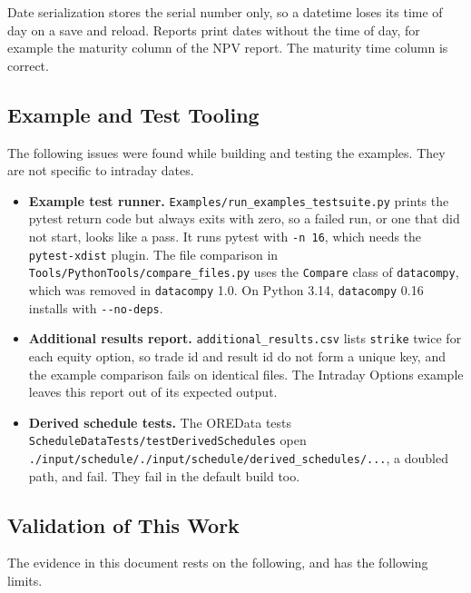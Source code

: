 \documentclass[12pt, a4paper]{article}
\begin{document}
Date serialization stores the serial number only, so a datetime loses its time of day on a save and reload. Reports
print dates without the time of day, for example the maturity column of the NPV report. The maturity time column is
correct.

\subsection{Example and Test Tooling}\label{sec:lim-tooling}

The following issues were found while building and testing the examples. They are not specific to intraday dates.

\begin{itemize}
\item \textbf{Example test runner.} \texttt{Examples/run\_examples\_testsuite.py} prints the pytest return code but
  always exits with zero, so a failed run, or one that did not start, looks like a pass. It runs pytest with
  \texttt{-n 16}, which needs the \texttt{pytest-xdist} plugin. The file comparison in
  \texttt{Tools/PythonTools/compare\_files.py} uses the \texttt{Compare} class of \texttt{datacompy}, which was removed
  in \texttt{datacompy} 1.0. On Python 3.14, \texttt{datacompy} 0.16 installs with \texttt{-{}-no-deps}.
\item \textbf{Additional results report.} \texttt{additional\_results.csv} lists \texttt{strike} twice for each equity
  option, so trade id and result id do not form a unique key, and the example comparison fails on identical files. The
  Intraday Options example leaves this report out of its expected output.
\item \textbf{Derived schedule tests.} The OREData tests \texttt{ScheduleDataTests/testDerivedSchedules} open
  \texttt{./input/schedule/./input/schedule/derived\_schedules/...}, a doubled path, and fail. They fail in the default
  build too.
\end{itemize}

\subsection{Validation of This Work}\label{sec:lim-validation}

The evidence in this document rests on the following, and has the following limits.
\end{document}
